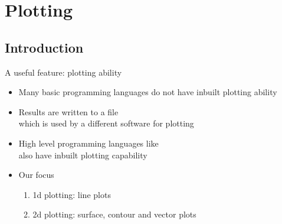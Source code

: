 \section{Plotting}

\subsection{Introduction}
\begin{frame}{A useful feature: plotting ability}
    \begin{itemize}
        \setitemsep{1em}
        \item Many basic programming languages do not have inbuilt plotting ability
        \item<2-> Results are written to a file\\which is used by a different software for plotting
        \item<3-> High level programming languages like \scilab{}\\also have inbuilt plotting capability
        \item<4-> Our focus
        \begin{enumerate}
            \item 1d plotting: line plots
            \item 2d plotting: surface, contour and vector plots
        \end{enumerate}
    \end{itemize}
\end{frame}

